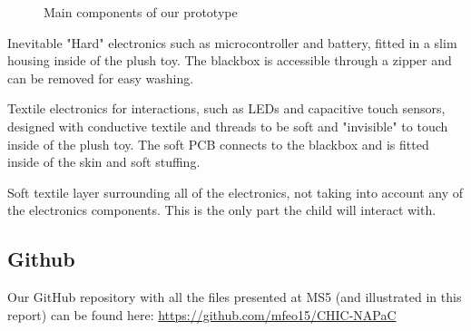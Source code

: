 \begin{figure}[H]
    \centering
    \hfill
    \hfill
    \hfill
    \caption{Main components of our prototype} 
    \label{fig:terminology}
\end{figure}



\begin{description}[align=left]
\item  [Blackbox (Fig. \ref{fig:blackbox1})] Inevitable "Hard" electronics such as microcontroller and battery, fitted in a slim housing inside of the plush toy. The blackbox is accessible through a zipper and can be removed for easy washing.
\item [Soft PCB (Fig. \ref{fig:softPCB1})] Textile electronics for interactions, such as LEDs and capacitive touch sensors, designed with conductive textile and threads to be soft and "invisible" to touch inside of the plush toy. The soft PCB connects to the blackbox and is fitted inside of the skin and soft stuffing.
\item [Skin (Fig. \ref{fig:skin1})] Soft textile layer surrounding all of the electronics, not taking into account any of the electronics components. This is the only part the child will interact with.
\end{description}

\subsection*{Github}

Our GitHub repository with all the files presented at MS5 (and illustrated in this report) can be found here: \url{https://github.com/mfeo15/CHIC-NAPaC}
